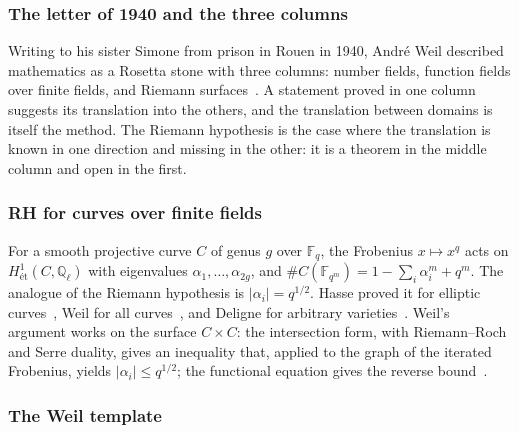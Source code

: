 \subsubsection{The letter of 1940 and the three columns}\label{ssec:weil-letter}

Writing to his sister Simone from prison in Rouen in 1940, Andr\'e Weil
described mathematics as a Rosetta stone with three columns: number fields,
function fields over finite fields, and Riemann surfaces~\cite{weil_letter40}.
A statement proved in one column suggests its translation into the others, and
the translation between domains is itself the method.  The Riemann hypothesis
is the case where the translation is known in one direction and missing in the
other: it is a theorem in the middle column and open in the first.

\subsubsection{RH for curves over finite fields}\label{ssec:weil-curves}

For a smooth projective curve $C$ of genus $g$ over $\mathbb{F}_q$, the
Frobenius $x\mapsto x^q$ acts on $H^1_{\text{\'et}}(C,\mathbb{Q}_\ell)$ with
eigenvalues $\alpha_1,\dots,\alpha_{2g}$, and
$\#C(\mathbb{F}_{q^m}) = 1 - \sum_i\alpha_i^m + q^m$.  The analogue of the
Riemann hypothesis is $|\alpha_i| = q^{1/2}$.  Hasse proved it for elliptic
curves~\cite{hasse34}, Weil for all curves~\cite{weil40,weil48}, and Deligne for
arbitrary varieties~\cite{deligne74}.  Weil's argument works on the surface
$C\times C$: the intersection form, with Riemann--Roch and Serre duality, gives
an inequality that, applied to the graph of the iterated Frobenius, yields
$|\alpha_i|\le q^{1/2}$; the functional equation gives the reverse
bound~\cite{milne15,oort14}.

\subsubsection{The Weil template}\label{ssec:weil-template}

